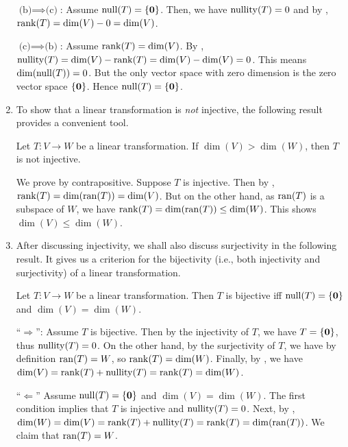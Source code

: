 \begin{enumerate}
\begin{pf}
\underline{\(\text{(b)}\implies \text{(c)}\)}: Assume \(\operatorname{null}(T)=\{\vb*{0}\}\).
Then, we have \(\operatorname{nullity}(T)=0\) and by ,
\(\operatorname{rank}(T)=\dim(V)-0=\dim(V)\).

\underline{\(\text{(c)}\implies \text{(b)}\)}: Assume \(\operatorname{rank}(T)=\dim(V)\). By
, \(\operatorname{nullity}(T)=\dim(V)-\operatorname{rank}(T)=\dim(V)-\dim(V)=0\). This means
\(\dim(\operatorname{null}(T))=0\). But the only vector space with zero dimension is the zero
vector space \(\{\vb*{0}\}\). Hence \(\operatorname{null}(T)=\{\vb*{0}\}\).
\end{pf}
\item To show that a linear transformation is \emph{not} injective, the
following result provides a convenient tool.

\begin{proposition}
\label{prp:suff-not-inj}
Let \(T:V\to W\) be a linear transformation. If \(\dim(V)>\dim(W)\), then \(T\)
is not injective.
\end{proposition}
\begin{pf}
We prove by contrapositive. Suppose \(T\) is injective. Then by
, \(\operatorname{rank}(T)=\dim(\operatorname{ran}(T))=\dim(V)\). But on the
other hand, as \(\operatorname{ran}(T)\) is a subspace of \(W\), we have
\(\operatorname{rank}(T)=\dim(\operatorname{ran}(T))\le\dim(W)\). This shows \(\dim(V)\le\dim(W)\).
\end{pf}

\item After discussing injectivity, we shall also discuss surjectivity in the
following result. It gives us a criterion for the bijectivity (i.e., both
injectivity and surjectivity) of a linear transformation.

\begin{theorem}
\label{thm:lin-tran-bij-crit}
Let \(T:V\to W\) be a linear transformation. Then \(T\) is bijective iff
\(\operatorname{null}(T)=\{\vb*{0}\}\) and \(\dim(V)=\dim(W)\).
\end{theorem}

\begin{pf}
``\(\Rightarrow\)'': Assume \(T\) is bijective. Then by the injectivity of
\(T\), we have \(\null{T}=\{\vect{0}\}\), thus \(\operatorname{nullity}(T)=0\). On the other
hand, by the surjectivity of \(T\), we have by definition \(\operatorname{ran}(T)=W\), so
\(\operatorname{rank}(T)=\dim(W)\). Finally, by , we have
\(\dim(V)=\operatorname{rank}(T)+\operatorname{nullity}(T)=\operatorname{rank}(T)=\dim(W)\).


``\(\Leftarrow\)'' Assume \(\operatorname{null}(T)=\{\vb*{0}\}\) and \(\dim(V)=\dim(W)\). The
first condition implies that \(T\) is injective and \(\operatorname{nullity}(T)=0\). Next, by
, \(\dim(W)=\dim(V)=\operatorname{rank}(T)+\operatorname{nullity}(T)=\operatorname{rank}(T)=\dim(\operatorname{ran}(T))\).
We claim that \(\operatorname{ran}(T)=W\).


\end{pf}
\end{enumerate}

